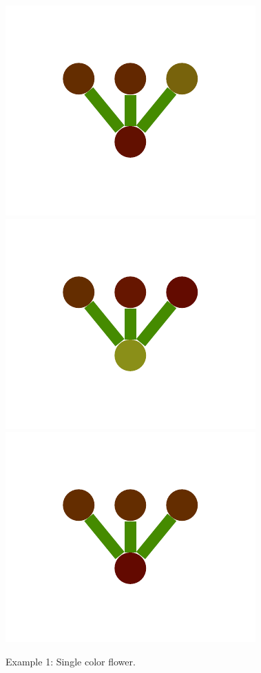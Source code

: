 \documentclass[a4paper,10pt]{article}
\begin{document}
\begin{figure}
{    \includegraphics[scale=.2]{./figures/6-1-single-color-flower-induced-6.pdf}
    \includegraphics[scale=.2]{./figures/6-1-single-color-flower-induced-7.pdf}
    \includegraphics[scale=.2]{./figures/6-1-single-color-flower-induced-8.pdf}
    \label{fig:exp-single-flower-induced}    
    }
  \caption{Example 1: Single color flower.}
  \label{fig:exp-single-flower}
\end{figure}
\end{document}

